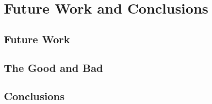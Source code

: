 \chapter{Future Work and Conclusions}\label{ch:5}

\section{Future Work}

\section{The Good and Bad}

\section{Conclusions}